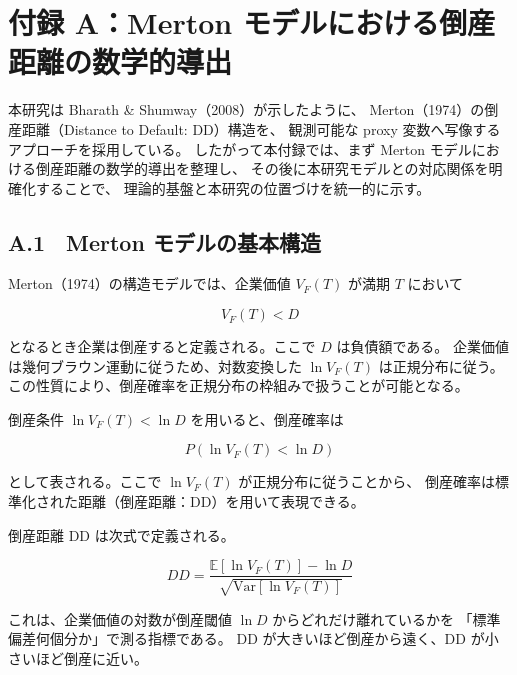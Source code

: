 \appendix
\chapter*{付録 A：Merton モデルにおける倒産距離の数学的導出}

本研究は Bharath \& Shumway（2008）が示したように、
Merton（1974）の倒産距離（Distance to Default: DD）構造を、
観測可能な proxy 変数へ写像するアプローチを採用している。
したがって本付録では、まず Merton モデルにおける倒産距離の数学的導出を整理し、
その後に本研究モデルとの対応関係を明確化することで、
理論的基盤と本研究の位置づけを統一的に示す。

\section*{A.1　Merton モデルの基本構造}

Merton（1974）の構造モデルでは、企業価値 $V_F(T)$ が満期 $T$ において



\[
V_F(T) < D
\]



となるとき企業は倒産すると定義される。ここで $D$ は負債額である。
企業価値は幾何ブラウン運動に従うため、対数変換した $\ln V_F(T)$ は正規分布に従う。
この性質により、倒産確率を正規分布の枠組みで扱うことが可能となる。

倒産条件 $\ln V_F(T) < \ln D$ を用いると、倒産確率は



\[
P\left( \ln V_F(T) < \ln D \right)
\]



として表される。ここで $\ln V_F(T)$ が正規分布に従うことから、
倒産確率は標準化された距離（倒産距離：DD）を用いて表現できる。

倒産距離 DD は次式で定義される。



\[
DD = \frac{\mathbb{E}[\ln V_F(T)] - \ln D}{\sqrt{\mathrm{Var}[\ln V_F(T)]}}
\]



これは、企業価値の対数が倒産閾値 $\ln D$ からどれだけ離れているかを
「標準偏差何個分か」で測る指標である。
DD が大きいほど倒産から遠く、DD が小さいほど倒産に近い。

